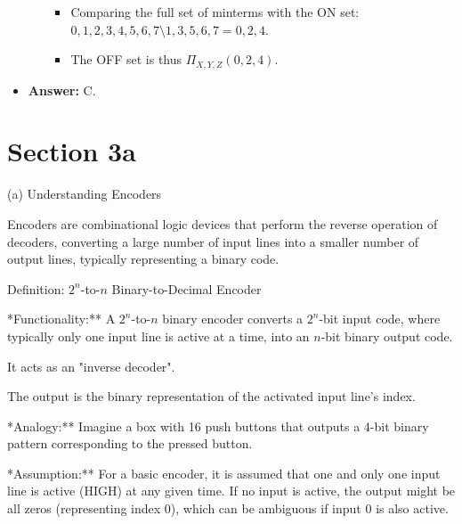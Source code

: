 \documentclass{article}
\begin{document}
\begin{itemize}
\begin{enumerate}
                \begin{itemize}
                    \item Comparing the full set of minterms with the ON set: ${0, 1, 2, 3, 4, 5, 6, 7} \setminus {1, 3, 5, 6, 7} = {0, 2, 4}$.
                    \item The OFF set is thus $\Pi_{X,Y,Z}(0,2,4)$.
                \end{itemize}
        \end{enumerate}

    \item \textbf{Answer:} C.
\end{itemize}



\section{Section 3a}

(a) Understanding Encoders

Encoders are combinational logic devices that perform the reverse operation of decoders, converting a large number of input lines into a smaller number of output lines, typically representing a binary code.

Definition: $2^n$-to-$n$ Binary-to-Decimal Encoder

\item **Functionality:** A $2^n$-to-$n$ binary encoder converts a $2^n$-bit input code, where typically only one input line is active at a time, into an $n$-bit binary output code.

    \item It acts as an "inverse decoder".

    \item The output is the binary representation of the activated input line's index.

    \item **Analogy:** Imagine a box with 16 push buttons that outputs a 4-bit binary pattern corresponding to the pressed button.

\item **Assumption:** For a basic encoder, it is assumed that one and only one input line is active (HIGH) at any given time. If no input is active, the output might be all zeros (representing index 0), which can be ambiguous if input 0 is also active.
\end{document}
